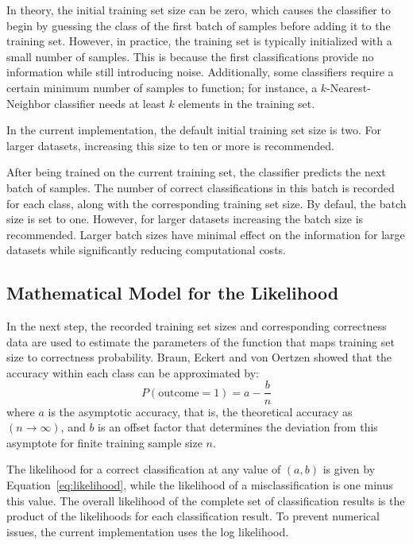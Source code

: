 \documentclass[article]{jss}
\begin{document}
In theory, the initial training set size can be zero, which causes the classifier to begin by guessing the class of the first batch of samples before adding it to the training set. However, in practice, the training set is typically initialized with a small number of samples. This is because the first classifications provide no information while still introducing noise. Additionally, some classifiers require a certain minimum number of samples to function; for instance, a $k$-Nearest-Neighbor classifier needs at least $k$ elements in the training set.

In the current implementation, the default initial training set size is two. For larger datasets, increasing this size to ten or more is recommended.

After being trained on the current training set, the classifier predicts the next batch of samples. The number of correct classifications in this batch is recorded for each class, along with the corresponding training set size. By defaul, the batch size is set to one. However, for larger datasets increasing the batch size is recommended. Larger batch sizes have minimal effect on the information for large datasets while significantly reducing computational costs.

\subsection{Mathematical Model for the Likelihood} \label{sec:math_model}
In the next step, the recorded training set sizes and corresponding correctness data are used to estimate the parameters of the function that maps training set size to correctness probability. Braun, Eckert and von Oertzen \citep{braun_independent_2023} showed that the accuracy within each class can be approximated by:
%
\begin{equation} \label{eq:likelihood}
P(\mathrm{outcome} = 1) = a - \frac{b}{n}
\end{equation}
%
where $a$ is the asymptotic accuracy, that is, the theoretical accuracy as $(n \to \infty)$, and $b$ is an offset factor that determines the deviation from this asymptote for finite training sample size $n$.

The likelihood for a correct classification at any value of $(a,b)$ is given by Equation~\ref{eq:likelihood}, while the likelihood of a misclassification is one minus this value. The overall likelihood of the complete set of classification results is the product of the likelihoods for each classification result. To prevent numerical issues, the current implementation uses the log likelihood.
\end{document}
